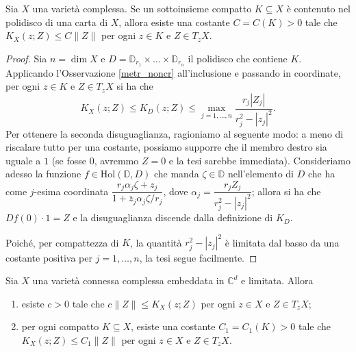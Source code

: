 \begin{lm} \label{polycpt}
    Sia $X$ una varietà complessa. Se un sottoinsieme compatto $K\subseteq X$ è contenuto nel polidisco di una carta di $X$, allora esiste una costante $C=C(K)>0$ tale che $K_X(z;Z) \le C\|Z\|$ per ogni $z \in K$ e $Z \in T_zX$.
\end{lm}

\begin{proof}
    Sia $n=\dim{X}$ e $D=\mathbb{D}_{r_1}\times\dots\times\mathbb{D}_{r_n}$ il polidisco che contiene $K$. Applicando l'Osservazione \ref{metr_noncr} all'inclusione e passando in coordinate, per ogni $z \in K$ e $Z \in T_zX$ si ha che
    $$K_X(z;Z) \le K_D(z;Z) \le \max_{j=1,\dots,n} \frac{r_j|Z_j|}{r_j^2-|z_j|^2}.$$
    Per ottenere la seconda disuguaglianza, ragioniamo al seguente modo: a meno di riscalare tutto per una costante, possiamo supporre che il membro destro sia uguale a $1$ (se fosse $0$, avremmo $Z=0$ e la tesi sarebbe immediata). Consideriamo adesso la funzione $f\in\text{Hol}(\mathbb{D},D)$ che manda $\zeta\in\mathbb{D}$ nell'elemento di $D$ che ha come $j$-esima coordinata $\dfrac{r_j\alpha_j\zeta+z_j}{1+\bar{z}_j\alpha_j\zeta/r_j}$, dove $\alpha_j=\dfrac{r_jZ_j}{r_j^2-|z_j|^2}$; allora si ha che $Df(0)\cdot 1=Z$ e la disuguaglianza discende dalla definizione di $K_D$.
    
    Poiché, per compattezza di $K$, la quantità $r_j^2-|z_j|^2$ è limitata dal basso da una costante positiva per $j=1,\dots,n$, la tesi segue facilmente.
\end{proof}

\begin{prop} \label{metrica_bilip}
    Sia $X$ una varietà connessa complessa embeddata in $\mathbb{C}^d$ e limitata. Allora
    \begin{enumerate}[label={(\arabic*)}]
        \item esiste $c>0$ tale che $c\|Z\| \le K_X(z;Z)$ per ogni $z \in X$ e $Z \in T_zX$;
        \item per ogni compatto $K\subseteq X$, esiste una costante $C_1=C_1(K)>0$ tale che $K_X(z;Z) \le C_1\|Z\|$ per ogni $z \in X$ e $Z \in T_zX$.
    \end{enumerate}
\end{prop}

